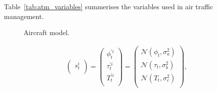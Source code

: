 Table~\ref{tab:atm_variables} summerises the variables used in air traffic management.

\setcounter{subfigure}{0}
\begin{figure}[t!]
\centering
{}
\caption{Aircraft model.}
\label{fig:atm_model}
\end{figure}

\begin{equation}
\begin{aligned}
  \begin{pmatrix}
    s^i_{t}    \\ 
  \end{pmatrix}
  =
  \begin{pmatrix}
  	\phi^{'i}_{t} \\
		\tau^{'i}_{t} \\
		T^{'i}_{t} \\
  \end{pmatrix}
  =
  \begin{pmatrix}
  	\mathcal{N}(\phi_{t},\sigma_a^2) \\
  	\mathcal{N}(\tau_{t},\sigma_b^2) \\
  	\mathcal{N}(T_{t},\sigma_c^2) \\
  \end{pmatrix}
	\mbox{, }
\end{aligned}
\label{eq:atm_c}
\end{equation}

